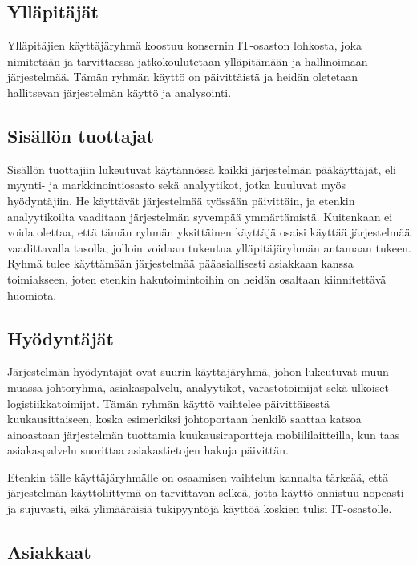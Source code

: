     \subsection*{Ylläpitäjät}

        Ylläpitäjien käyttäjäryhmä koostuu konsernin IT-osaston lohkosta, joka nimitetään ja tarvittaessa jatkokoulutetaan ylläpitämään ja hallinoimaan 
        järjestelmää. Tämän ryhmän käyttö on päivittäistä ja heidän oletetaan hallitsevan järjestelmän käyttö ja analysointi.

    \subsection*{Sisällön tuottajat}

        Sisällön tuottajiin lukeutuvat käytännössä kaikki järjestelmän pääkäyttäjät, eli myynti- ja markkinointiosasto sekä analyytikot, jotka kuuluvat 
        myös hyödyntäjiin. He käyttävät järjestelmää työssään päivittäin, ja etenkin analyytikoilta vaaditaan järjestelmän syvempää ymmärtämistä. Kuitenkaan ei
        voida olettaa, että tämän ryhmän yksittäinen käyttäjä osaisi käyttää järjestelmää vaadittavalla tasolla, jolloin voidaan tukeutua 
        ylläpitäjäryhmän antamaan tukeen. Ryhmä tulee käyttämään järjestelmää pääasiallisesti asiakkaan kanssa toimiakseen, joten etenkin hakutoimintoihin on heidän osaltaan kiinnitettävä
        huomiota.

    \subsection*{Hyödyntäjät}

        Järjestelmän hyödyntäjät ovat suurin käyttäjäryhmä, johon lukeutuvat muun muassa johtoryhmä, asiakaspalvelu, analyytikot, varastotoimijat sekä 
        ulkoiset logistiikkatoimijat. Tämän ryhmän käyttö vaihtelee päivittäisestä kuukausittaiseen, koska esimerkiksi johtoportaan henkilö saattaa katsoa 
        ainoastaan järjestelmän tuottamia kuukausiraportteja mobiililaitteilla, kun taas asiakaspalvelu suorittaa asiakastietojen hakuja päivittän.

        Etenkin tälle käyttäjäryhmälle on osaamisen vaihtelun kannalta tärkeää, että järjestelmän käyttöliittymä on tarvittavan selkeä, jotta 
        käyttö onnistuu nopeasti ja sujuvasti, eikä ylimääräisiä tukipyyntöjä käyttöä koskien tulisi IT-osastolle.

    \subsection*{Asiakkaat}

